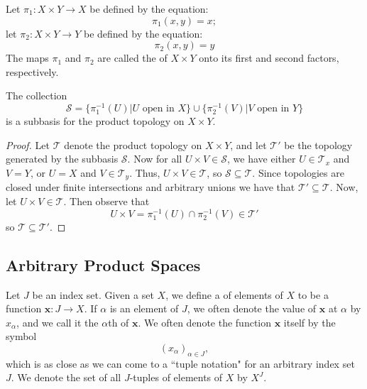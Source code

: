 \documentclass[12pt, a4paper, oneside, openright, titlepage]{book}
\begin{document}
\begin{defn}
    Let $\pi_1:X\times Y\rightarrow X$ be defined by the equation: \begin{equation*}
        \pi_1(x,y) = x;
    \end{equation*}
    let $\pi_2:X\times Y\rightarrow Y$ be defined by the equation: \begin{equation*}
        \pi_2(x,y) = y
    \end{equation*}
    The maps $\pi_1$ and $\pi_2$ are called the  of $X\times Y$ onto its first and second factors, respectively.
\end{defn}


\begin{thm}
    The collection \begin{equation*}
        \mathcal{S} = \{\pi_1^{-1}(U)\vert U\text{ open in }X\}\cup\{\pi_2^{-1}(V)\vert V\text{ open in }Y\}
    \end{equation*}
    is a subbasis for the product topology on $X\times Y$.
\end{thm}
\begin{proof}
    Let $\mathcal{T}$ denote the product topology on $X\times Y$, and let $\mathcal{T}'$ be the topology generated by the subbasis $\mathcal{S}$. Now for all $U \times V \in \mathcal{S}$, we have either $U \in \mathcal{T}_x$ and $V = Y$, or $U = X$ and $V \in \mathcal{T}_y$. Thus, $U\times V \in \mathcal{T}$, so $\mathcal{S} \subseteq \mathcal{T}$. Since topologies are closed under finite intersections and arbitrary unions we have that $\mathcal{T}' \subseteq \mathcal{T}$. Now, let $U \times V \in \mathcal{T}$. Then observe that \begin{equation*}
        U\times V = \pi_1^{-1}(U)\cap\pi_2^{-1}(V) \in \mathcal{T}'
    \end{equation*}
    so $\mathcal{T} \subseteq \mathcal{T}'$.
\end{proof}


\subsection{Arbitrary Product Spaces}

\begin{defn}
    Let $J$ be an index set. Given a set $X$, we define a  of elements of $X$ to be a function $\mathbf{x}:J\rightarrow X$. If $\alpha$ is an element of $J$, we often denote the value of $\mathbf{x}$ at $\alpha$ by $x_{\alpha}$, and we call it the $\alpha$th  of $\mathbf{x}$. We often denote the function $\mathbf{x}$ itself by the symbol \begin{equation*}
        (x_{\alpha})_{\alpha \in J},
    \end{equation*}
    which is as close as we can come to a ``tuple notation" for an arbitrary index set $J$. We denote the set of all $J$-tuples of elements of $X$ by $X^J$.
\end{defn}
\end{document}
